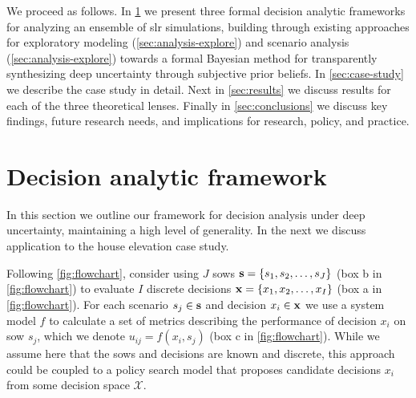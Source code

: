 \documentclass[11pt]{article}
\begin{document}
We proceed as follows.
In \cref{sec:analysis} we present three formal decision analytic frameworks for analyzing an ensemble of \gls{slr} simulations, building through existing approaches for exploratory modeling (\cref{sec:analysis-explore}) and scenario analysis (\cref{sec:analysis-explore}) towards a formal Bayesian method for transparently synthesizing deep uncertainty through subjective prior beliefs.
In \cref{sec:case-study} we describe the case study in detail.
Next in \cref{sec:results} we discuss results for each of the three theoretical lenses.
Finally in \cref{sec:conclusions} we discuss key findings, future research needs, and implications for research, policy, and practice.

\section{Decision analytic framework}\label{sec:analysis}

In this section we outline our framework for decision analysis under deep uncertainty, maintaining a high level of generality.
In the next we discuss application to the house elevation case study.

Following \cref{fig:flowchart}, consider using $J$ \glspl{sow} $\vb{s} = \qty{s_1, s_2, \ldots, s_J}$ (box b in \cref{fig:flowchart}) to evaluate $I$ discrete decisions $\vb{x} = \qty{x_1, x_2, \ldots, x_I}$ (box a in \cref{fig:flowchart}).
For each scenario $s_j \in \vb{s}$ and decision $x_i \in \vb{x}$ we use a system model $f$ to calculate a set of metrics describing the performance of decision $x_i$ on \gls{sow} $s_j$, which we denote $u_{ij} = f(x_i, s_j)$ (box c in \cref{fig:flowchart}).
While we assume here that the \glspl{sow} and decisions are known and discrete, this approach could be  coupled to a policy search model that proposes candidate decisions $x_i$ from some decision space $\mathcal{X}$.
\end{document}
